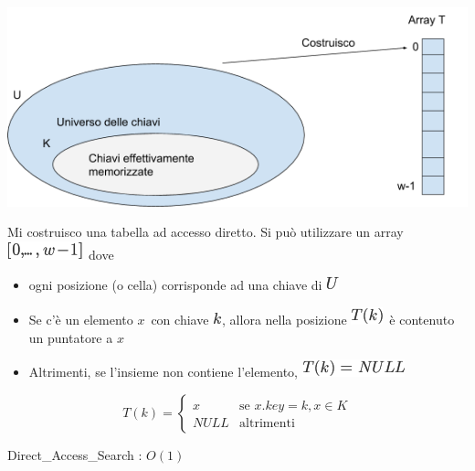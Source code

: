 \documentclass{article}
\providecommand{\tightlist}{%
  \setlength{\itemsep}{0pt}\setlength{\parskip}{0pt}}
\begin{document}
{{\includegraphics{images/image521.png}}

{}

{Mi costruisco una tabella ad accesso diretto. Si può utilizzare un
array }\includegraphics{images/image225.png}{~dove}

\begin{itemize}
\tightlist
\item
  {ogni posizione (o cella) corrisponde ad una chiave di
  }\includegraphics{images/image222.png}
\item
  {Se c'è un elemento }$x${~con chiave
  }\includegraphics{images/image118.png}{, allora nella posizione
  }\includegraphics{images/image226.png}{~è contenuto un puntatore a
  }$x$
\item
  {Altrimenti, se l'insieme non contiene l'elemento,
  }\includegraphics{images/image227.png}
\end{itemize}

{}

\begin{equation}
T(k) = 
\begin{cases}
x & \mbox{se } x.key=k, x\in K \\ 
NULL & \mbox{altrimenti} 
\end{cases}
\end{equation}

{Direct\_Access\_Search : }$O(1)$

}
\end{document}
